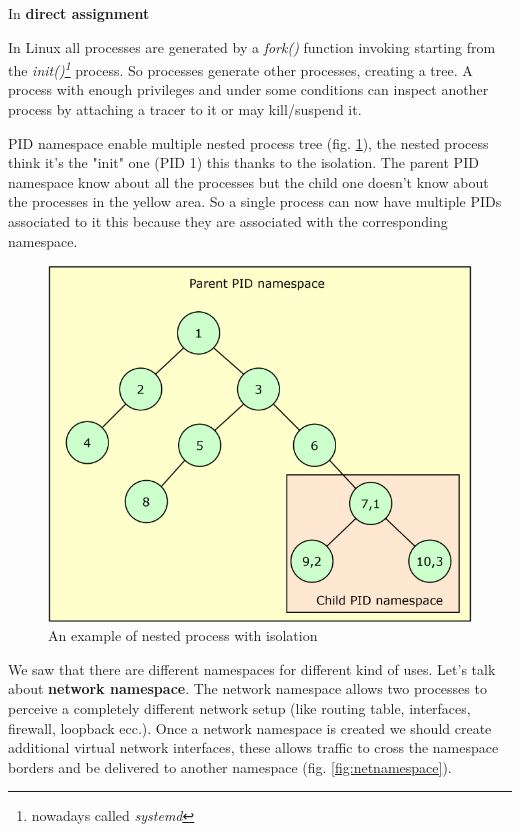 In \textbf{direct assignment}













In Linux all processes are generated by a \textit{fork()} function invoking starting from the \textit{init()\footnote{nowadays called \textit{systemd}}} process. So processes generate other processes, creating a tree. A process with enough privileges and under some conditions can inspect another process by attaching a tracer to it or may kill/suspend it.

PID namespace enable multiple nested process tree (fig. \ref{fig:nestedtree}), the nested process think it's the "init" one (PID 1) this thanks to the isolation. The parent PID namespace know about all the processes but the child one doesn't know about the processes in the yellow area. So a single process can now have multiple PIDs associated to it this because they are associated with the corresponding namespace.

\begin{figure}
    \centering
    \includegraphics[scale=0.4]{images/processtree.png}
    \caption{An example of nested process with isolation}
    \label{fig:nestedtree}
\end{figure}

We saw that there are different namespaces for different kind of uses. Let's talk about \textbf{network namespace}. The network namespace allows two processes to perceive a completely different network setup (like routing table, interfaces, firewall, loopback ecc.). Once a network namespace is created we should create additional virtual network interfaces, these allows traffic to cross the namespace borders and be delivered to another namespace (fig. \ref{fig:netnamespace}).

